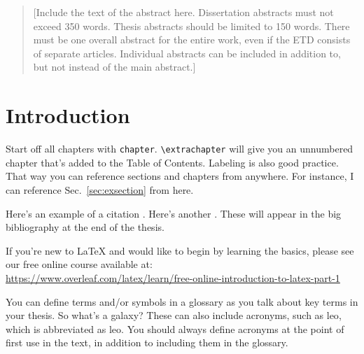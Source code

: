 \documentclass[12pt]{cwru_thesis}
\begin{document}
\printglossary[type=\acronymtype, title=List of Abbreviations]

\printglossary

\printnomenclature

\begin{abstract}
   [Include the text of the abstract here. Dissertation abstracts must not exceed 350 words. Thesis abstracts should be limited to 150 words. There must be one overall abstract for the entire work, even if the ETD consists of separate articles. Individual abstracts can be included in addition to, but not instead of the main abstract.]
\end{abstract}

\mainmatter

\setcounter{secnumdepth}{2}

\chapter{Introduction} \label{chap:intro}
Start off all chapters with \verb|chapter|. \verb|\extrachapter| will give you an unnumbered chapter that's added to the Table of Contents. Labeling is also good practice. That way you can reference sections and chapters from anywhere. For instance, I can reference Sec.~\ref{sec:exsection} from here.

Here's an example of a citation \citep{GMP81}. Here's another \citep{PP98}. These will appear in the big bibliography at the end of the thesis.

If you're new to \LaTeX{} and would like to begin by learning the basics, please see our free online course available at:\\ \url{https://www.overleaf.com/latex/learn/free-online-introduction-to-latex-part-1} 

You can define terms and/or symbols in a glossary  as you talk about key terms in your thesis. So what's a \gls{galaxy}? These can also include acronyms, such as \acrlong{leo}, which is abbreviated as \acrshort{leo}. You should always define acronyms at the point of first use in the text, in addition to including them in the glossary.
\end{document}
